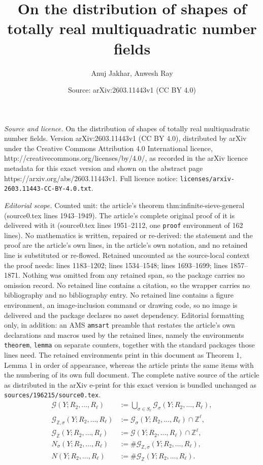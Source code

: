 \documentclass[10pt,a4paper]{amsart}
\title{On the distribution of shapes of totally real multiquadratic number fields}
\author{Anuj Jakhar, Anwesh Ray}
\date{Source: arXiv:2603.11443v1 (CC BY 4.0)}
\begin{document}
\maketitle

\noindent\emph{Source and licence.} On the distribution of shapes of totally real multiquadratic number fields. Version arXiv:2603.11443v1 (CC BY 4.0), distributed by arXiv under the Creative Commons Attribution 4.0 International licence, http://creativecommons.org/licenses/by/4.0/, as recorded in the arXiv licence metadata for this exact version and shown on the abstract page https://arxiv.org/abs/2603.11443v1. Full licence notice: \texttt{licenses/arxiv-2603.11443-CC-BY-4.0.txt}.\par\smallskip

\noindent\textit{Editorial scope.} Counted unit: the article's theorem thm:infinite-sieve-general (source0.tex lines 1943--1949). The article's complete original proof of it is delivered with it (source0.tex lines 1951--2112, one \texttt{proof} environment of 162 lines). No mathematics is written, repaired or re-derived: the statement and the proof are the article's own lines, in the article's own notation, and no retained line is substituted or re-flowed.  Retained uncounted as the source-local context the proof needs: lines 1183--1202; lines 1534--1548; lines 1693--1699; lines 1857--1871.  Nothing was omitted from any retained span, so the package carries no omission record.  No retained line contains a citation, so the wrapper carries no bibliography and no bibliography entry.  No retained line contains a figure environment, an image-inclusion command or drawing code, so no image is delivered and the package declares no asset dependency.  Editorial formatting only, in addition: an AMS \texttt{amsart} preamble that restates the article's own declarations and macros used by the retained lines, namely the environments \texttt{theorem}, \texttt{lemma} on separate counters, together with the standard packages those lines need.  The retained environments print in this document as Theorem 1, Lemma 1 in order of appearance, whereas the article prints the same items with the numbering of its own full document.  The complete native source of the article as distributed in the arXiv e-print for this exact version is bundled unchanged as \texttt{sources/196215/source0.tex}.
\begin{equation}\label{notation of G etc}
\begin{aligned}
\mathcal G(Y;R_2,\dots,R_\ell)
&:=
\bigcup_{\sigma\in S_{\ell}}
\mathcal G_\sigma(Y;R_2,\dots,R_\ell), \\
\mathcal G_{\mathbb Z,\sigma}(Y;R_2,\dots,R_\ell)
&:=
\mathcal G_\sigma(Y;R_2,\dots,R_\ell)\cap \mathbb Z^\ell, \\
\mathcal G_{\mathbb Z}(Y;R_2,\dots,R_\ell)
&:=
\mathcal G(Y;R_2,\dots,R_\ell)\cap \mathbb Z^\ell, \\
N_\sigma(Y;R_2,\dots,R_\ell)
&:=
\#\mathcal G_{\mathbb Z,\sigma}(Y;R_2,\dots,R_\ell), \\
N(Y;R_2,\dots,R_\ell)
&:=
\#\mathcal G_{\mathbb Z}(Y;R_2,\dots,R_\ell).
\end{aligned}
\end{equation}
\end{document}
